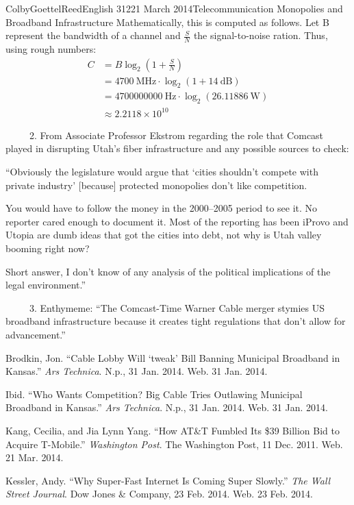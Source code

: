 \documentclass[12pt]{article}
\begin{document}
\begin{mla}{Colby}{Goettel}{Reed}{English 312}{21 March 2014}{Telecommunication Monopolies and Broadband Infrastructure}
Mathematically, this is computed as follows. Let B represent the bandwidth of a channel and $\frac{S}{N}$ the signal-to-noise ration. Thus, using rough numbers:
\begin{align*}
    C&=B\log_2\left(1+\frac{S}{N}\right) \\
     &=4700~\text{MHz}\cdot\log_2\left(1+14~\text{dB}\right) \\
     &=4700000000~\text{Hz}\cdot\log_2(26.11886~\text{W}) \\
     &\approx2.2118\times10^{10}
\end{align*}

{\noindent\ \ \ \ \ 2. From Associate Professor Ekstrom regarding the role that Comcast played in disrupting Utah's fiber infrastructure and any possible sources to check:}
\begin{mlaquote}
    ``Obviously the legislature would argue that `cities shouldn't compete with private industry' [because] protected monopolies don't like competition.

    You would have to follow the money in the 2000--2005 period to see it. No reporter cared enough to document it. Most of the reporting has been iProvo and Utopia are dumb ideas that got the cities into debt, not why is Utah valley booming right now?

    Short answer, I don't know of any analysis of the political implications of the legal environment.''
\end{mlaquote}

{\noindent\ \ \ \ \ 3. Enthymeme: ``The Comcast-Time Warner Cable merger stymies US broadband infrastructure because it creates tight regulations that don't allow for advancement.''}

\begin{workscited}
    \bibent Brodkin, Jon. ``Cable Lobby Will `tweak' Bill Banning Municipal Broadband in Kansas.'' \textit{Ars Technica}. N.p., 31 Jan. 2014. Web. 31 Jan. 2014.
    
    \bibent Ibid. ``Who Wants Competition? Big Cable Tries Outlawing Municipal Broadband in Kansas.'' \textit{Ars Technica}. N.p., 31 Jan. 2014. Web. 31 Jan. 2014.
    
    \bibent Kang, Cecilia, and Jia Lynn Yang. ``How AT\&T Fumbled Its \$39 Billion Bid to Acquire T-Mobile.'' \textit{Washington Post}. The Washington Post, 11 Dec. 2011. Web. 21 Mar. 2014.
    
    \bibent Kessler, Andy. ``Why Super-Fast Internet Is Coming Super Slowly.'' \textit{The Wall Street Journal}. Dow Jones \& Company, 23 Feb. 2014. Web. 23 Feb. 2014.
    

\end{workscited}
\end{mla}
\end{document}
